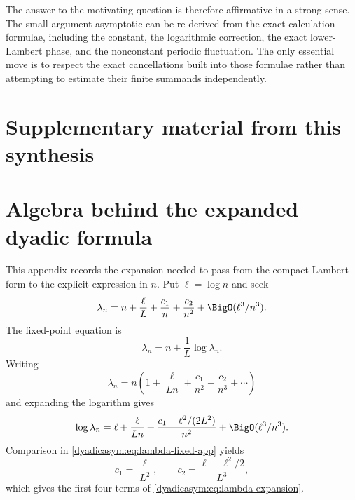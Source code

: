 \documentclass[11pt,oneside]{article}
\theoremstyle{definition}
\theoremstyle{remark}
\begin{document}
The answer to the motivating question is therefore affirmative in a strong sense.  The
small-argument asymptotic can be re-derived from the exact calculation formulae, including the
constant, the logarithmic correction, the exact lower-Lambert phase, and the nonconstant
periodic fluctuation.  The only essential move is to respect the exact cancellations built
into those formulae rather than attempting to estimate their finite summands independently.

\clearpage
\section*{Supplementary material from this synthesis}
\section{Algebra behind the expanded dyadic formula}
\label{dyadicasym:app:algebra}

This appendix records the expansion needed to pass from the compact Lambert form to the
explicit expression in $n$.  Put $\ell=\log n$ and seek
\begin{equation}
 \lambda_n=n+\frac\ell L+\frac{c_1}{n}+\frac{c_2}{n^2}
 +\BigO(\ell^3/n^3).                                       \label{dyadicasym:eq:lambda-ansatz}
\end{equation}
The fixed-point equation is
\begin{equation}
 \lambda_n=n+\frac1L\log\lambda_n.                         \label{dyadicasym:eq:lambda-fixed-app}
\end{equation}
Writing
\begin{equation*}
 \lambda_n=n\left(1+\frac\ell{Ln}+\frac{c_1}{n^2}
 +\frac{c_2}{n^3}+\cdots\right)
\end{equation*}
and expanding the logarithm gives
\begin{equation*}
 \log\lambda_n=
 \ell+\frac\ell{Ln}+\frac{c_1-\ell^2/(2L^2)}{n^2}
 +\BigO(\ell^3/n^3).
\end{equation*}
Comparison in \eqref{dyadicasym:eq:lambda-fixed-app} yields
\begin{equation}
 c_1=\frac\ell{L^2},
 \qquad
 c_2=\frac{\ell-\ell^2/2}{L^3},                            \label{dyadicasym:eq:c1-c2}
\end{equation}
which gives the first four terms of \eqref{dyadicasym:eq:lambda-expansion}.
\end{document}
